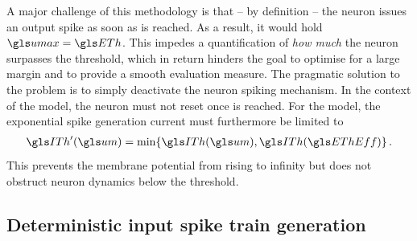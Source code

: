A major challenge of this methodology is that -- by definition -- the neuron issues an output spike as soon as \EThEff is reached. As a result, it would hold $\umax = \ETh$. This impedes a quantification of \emph{how much} the neuron surpasses the threshold, which in return hinders the goal to optimise for a large margin and to provide a smooth evaluation measure. The pragmatic solution to the problem is to simply deactivate the neuron spiking mechanism. In the context of the \LIF model, the neuron must not reset once \ETh is reached. For the \AdEx model, the exponential spike generation current must furthermore be limited to
\begin{align}
	\ITh'(\um) = \min\{\ITh(\um), \ITh(\EThEff)\} \,.
\end{align}
This prevents the membrane potential from rising to infinity but does not obstruct neuron dynamics below the threshold.

\subsection{Deterministic input spike train generation}
\label{sec:deterministic_input_spike_train}


